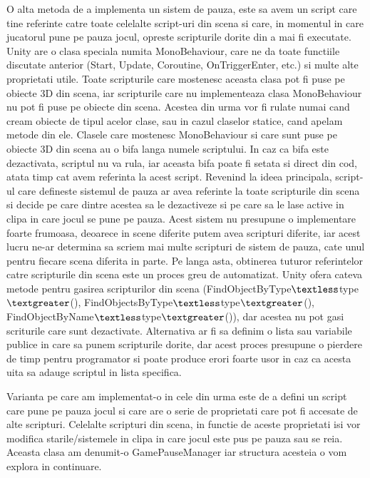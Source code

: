 \documentclass[12pt, a4paper]{article}
\begin{document}
	O alta metoda de a implementa un sistem de pauza, este sa avem un script care tine referinte catre toate celelalte script-uri din scena si care, in momentul in care jucatorul pune pe pauza jocul, opreste scripturile dorite din a mai fi executate. Unity are o clasa speciala numita MonoBehaviour, care ne da toate functiile discutate anterior (Start, Update, Coroutine, OnTriggerEnter, etc.) si multe alte proprietati utile. Toate scripturile care mostenesc aceasta clasa pot fi puse pe obiecte 3D din scena, iar scripturile care nu implementeaza clasa MonoBehaviour nu pot fi puse pe obiecte din scena. Acestea din urma vor fi rulate numai cand cream obiecte de tipul acelor clase, sau in cazul claselor statice, cand apelam metode din ele. Clasele care mostenesc MonoBehaviour si care sunt puse pe obiecte 3D din scena au o bifa langa numele scriptului. In caz ca bifa este dezactivata, scriptul nu va rula, iar aceasta bifa poate fi setata si direct din cod, atata timp cat avem referinta la acest script. Revenind la ideea principala, script-ul care defineste sistemul de pauza ar avea referinte la toate scripturile din scena si decide pe care dintre acestea sa le dezactiveze si pe care sa le lase active in clipa in care jocul se pune pe pauza. Acest sistem nu presupune o implementare foarte frumoasa, deoarece in scene diferite putem avea scripturi diferite, iar acest lucru ne-ar determina sa scriem mai multe scripturi de sistem de pauza, cate unul pentru fiecare scena diferita in parte. Pe langa asta, obtinerea tuturor referintelor catre scripturile din scena este un proces greu de automatizat. Unity ofera cateva metode pentru gasirea scripturilor din scena (FindObjectByType$\textless$type$\textgreater$(), FindObjectsByType$\textless$type$\textgreater$(), FindObjectByName$\textless$type$\textgreater$()), dar acestea nu pot gasi scriturile care sunt dezactivate. Alternativa ar fi sa definim o lista sau variabile publice in care sa punem scripturile dorite, dar acest proces presupune o pierdere de timp pentru programator si poate produce erori foarte usor in caz ca acesta uita sa adauge scriptul in lista specifica.
	
	Varianta pe care am implementat-o in cele din urma este de a defini un script care pune pe pauza jocul si care are o serie de proprietati care pot fi accesate de alte scripturi. Celelalte scripturi din scena, in functie de aceste proprietati isi vor modifica starile/sistemele in clipa in care jocul este pus pe pauza sau se reia. Aceasta clasa am denumit-o GamePauseManager iar structura acesteia o vom explora in continuare.
	
\end{document}
